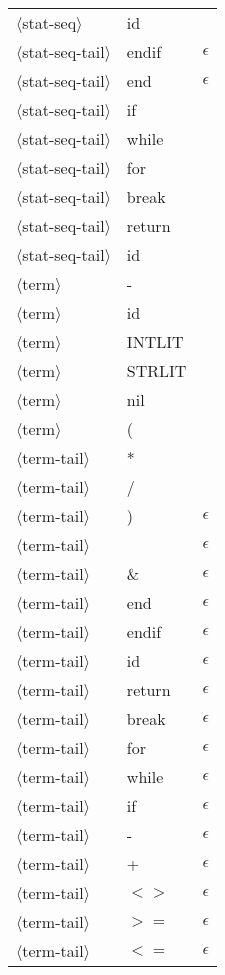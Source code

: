 \documentclass[11pt, fleqn]{article}
\newcommand{\atag}[1]{$\langle$#1$\rangle$}
\begin{document}
\begin{longtable}{l|l|l}
\atag{stat-seq}					&	id		&			\\
\atag{stat-seq-tail}				&	endif			&	$\epsilon$	\\
\atag{stat-seq-tail}				&	end			&	$\epsilon$	\\
\atag{stat-seq-tail}				&	if			&		\\
\atag{stat-seq-tail}				&	while			&		\\
\atag{stat-seq-tail}				&	for			&		\\
\atag{stat-seq-tail}				&	break			&		\\
\atag{stat-seq-tail}				&	return			&		\\
\atag{stat-seq-tail}				&	id			&		\\
\atag{term}				&	-		&			\\
\atag{term}				&	id		&			\\
\atag{term}				&	INTLIT	&			\\
\atag{term}				&	STRLIT	&			\\
\atag{term}				&	nil		&			\\
\atag{term}				&	(		&			\\
\atag{term-tail}					&	*		&			\\
\atag{term-tail}					&	/		&			\\
\atag{term-tail}					&	)		&	$\epsilon$		\\
\atag{term-tail}					&	\textbar		&	$\epsilon$		\\
\atag{term-tail}					&	\&		&	$\epsilon$		\\
\atag{term-tail}					&	end		&	$\epsilon$		\\
\atag{term-tail}					&	endif	&	$\epsilon$		\\
\atag{term-tail}					&	id		&	$\epsilon$		\\
\atag{term-tail}					&	return	&	$\epsilon$		\\
\atag{term-tail}					&	break	&	$\epsilon$		\\
\atag{term-tail}					&	for		&	$\epsilon$		\\
\atag{term-tail}					&	while	&	$\epsilon$		\\
\atag{term-tail}					&	if		&	$\epsilon$		\\
\atag{term-tail}					&	-		&	$\epsilon$		\\
\atag{term-tail}					&	+		&	$\epsilon$		\\
\atag{term-tail}					&	$<>$		&	$\epsilon$		\\
\atag{term-tail}					&	$>=$		&	$\epsilon$		\\
\atag{term-tail}					&	$<=$		&	$\epsilon$		\\

\end{longtable}
\end{document}
